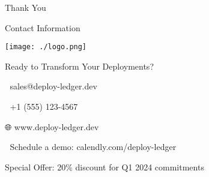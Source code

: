 \documentclass[presentation,aspectratio=169]{beamer}
\begin{document}
\begin{frame}[label={sec:orgb952c07}]{Thank You}
\begin{block}{Contact Information}
\begin{center}
\begin{center}
\texttt{[image: ./logo.png]}
\end{center}

\alert{Ready to Transform Your Deployments?}

📧 sales@deploy-ledger.dev

📱 +1 (555) 123-4567

🌐 www.deploy-ledger.dev

📅 Schedule a demo: calendly.com/deploy-ledger

\alert{Special Offer}: 20\% discount for Q1 2024 commitments
\end{center}
\end{block}
\end{frame}
\end{document}
